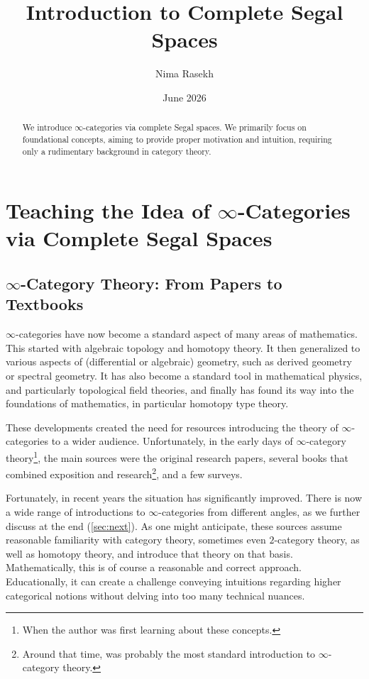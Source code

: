 \documentclass[11pt, a4paper]{amsart}
\title{Introduction to Complete Segal Spaces}
\author{Nima Rasekh}
\date{June 2026}
\theoremstyle{definition}
\theoremstyle{remark}
\numberwithin{equation}{section}
\begin{document}
\begin{abstract}
  We introduce $\infty$-categories via complete Segal spaces. We primarily focus on foundational concepts, aiming to provide proper motivation and intuition, requiring only a rudimentary background in category theory. 
\end{abstract}

\maketitle

\tableofcontents

\section{Teaching the Idea of \texorpdfstring{$\infty$}{oo}-Categories via Complete Segal Spaces}\label{sec:intro}
 
\subsection{\texorpdfstring{$\infty$}{oo}-Category Theory: From Papers to Textbooks} 
$\infty$-categories have now become a standard aspect of many areas of mathematics. This started with algebraic topology and homotopy theory. It then generalized to various aspects of (differential or algebraic) geometry, such as derived geometry or spectral geometry. It has also become a standard tool in mathematical physics, and particularly topological field theories, and finally has found its way into the foundations of mathematics, in particular homotopy type theory.

These developments created the need for resources introducing the theory of $\infty$-categories to a wider audience. Unfortunately, in the early days of $\infty$-category theory\footnote{When the author was first learning about these concepts.}, the main sources were the original research papers, several books that combined exposition and research\footnote{Around that time, \cite{lurie2009htt} was probably the most standard introduction to $\infty$-category theory.}, and a few surveys.

Fortunately, in recent years the situation has significantly improved. There is now a wide range of introductions to $\infty$-categories from different angles, as we further discuss at the end (\cref{sec:next}). As one might anticipate, these sources assume reasonable familiarity with category theory, sometimes even $2$-category theory, as well as homotopy theory, and introduce that theory on that basis. Mathematically, this is of course a reasonable and correct approach. Educationally, it can create a challenge conveying intuitions regarding higher categorical notions without delving into too many technical nuances.
\end{document}
